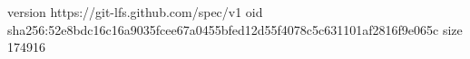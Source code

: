 version https://git-lfs.github.com/spec/v1
oid sha256:52e8bdc16c16a9035fcee67a0455bfed12d55f4078c5c631101af2816f9e065c
size 174916

